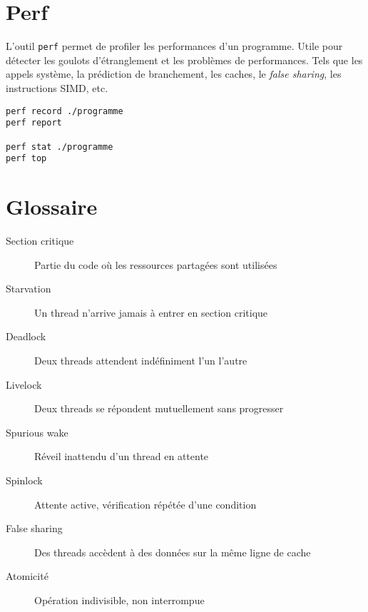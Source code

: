 \documentclass{article}
\newcommand{\cd}{\lstinline}
\begin{document}
\begin{multicols*}{3}
\section *{Perf}
L'outil \cd{perf} permet de profiler les performances d'un programme.
Utile pour détecter les goulots d'étranglement et les problèmes de performances.
Tels que les appels système, la prédiction de branchement, les caches,
le \emph{false sharing}, les instructions SIMD, etc.

\begin{lstlisting}
perf record ./programme
perf report

perf stat ./programme
perf top
\end{lstlisting}

\section *{Glossaire}
\begin{description}
    \item[Section critique] Partie du code où les ressources partagées sont utilisées
    \item[Starvation] Un thread n'arrive jamais à entrer en section critique
    \item[Deadlock] Deux threads attendent indéfiniment l'un l'autre
    \item[Livelock] Deux threads se répondent mutuellement sans progresser
    \item[Spurious wake] Réveil inattendu d'un thread en attente
    \item[Spinlock] Attente active, vérification répétée d'une condition
    \item[False sharing] Des threads accèdent à des données sur la même ligne de cache
    \item[Atomicité] Opération indivisible, non interrompue
\end{description}
\end{multicols*}
\end{document}
